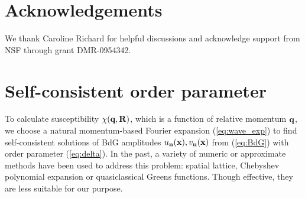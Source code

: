 \documentclass[prb,aps,showpacs,amsmath,twocolumn,10pt]{revtex4-1}
\begin{document}
\section{Acknowledgements}

We thank Caroline Richard for helpful discussions and 
acknowledge support from NSF through grant DMR-0954342. 



\appendix*

\section{Self-consistent order parameter}
\label{app:self-cons}

To calculate susceptibility $\chi({\bf q},{\bf R})$, which is a function
of relative momentum ${\bf q}$, we choose a natural momentum-based Fourier
expansion (\ref{eq:wave_exp}) to find 
self-consistent solutions of BdG amplitudes $u_{\bf n}({\bf x}),v_{\bf n}({\bf x})$ from (\ref{eq:BdG}) with order parameter
(\ref{eq:delta}). 
In the past, a variety of numeric or approximate
methods have been used to address this problem: spatial lattice\cite{PhysRevB.57.8709,PhysRevLett.80.4763, Marcin2009},
Chebyshev polynomial expansion\cite{PhysRevLett.105.167006} or
quasiclassical Greens functions.\cite{Burkhardt1994, Vorontsov2005fflo} 
Though effective, they are less suitable for our purpose.
\end{document}
